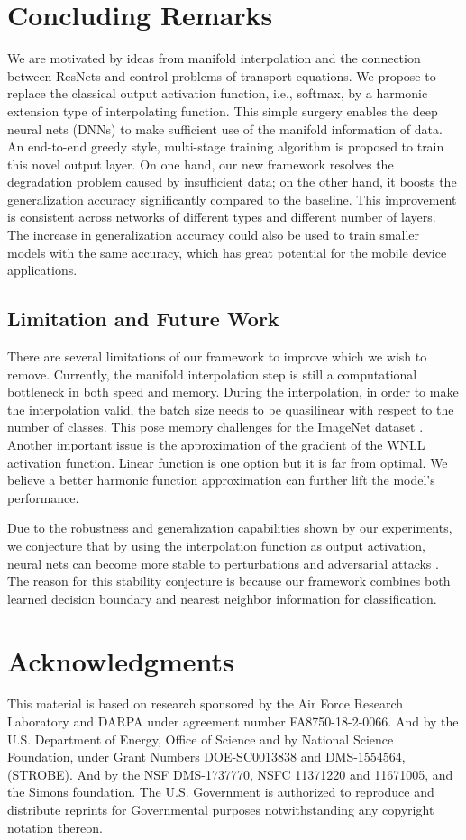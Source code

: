\documentclass{article}
\begin{document}
\section{Concluding Remarks}
We are motivated by ideas from manifold interpolation and the connection between ResNets and control problems of transport equations. We propose to replace the classical output activation function, i.e., softmax, by a harmonic extension type of interpolating function. This simple surgery enables the deep neural nets (DNNs) to make sufficient use of the manifold information of data. An end-to-end greedy style, multi-stage training algorithm is proposed to train this novel output layer. On one hand, our new framework resolves the degradation problem caused by insufficient data; on the other hand, it boosts the generalization accuracy significantly compared to the baseline. This improvement is consistent across networks of different types and different number of layers. The increase in generalization accuracy could also be used to train smaller models with the same accuracy, which has great potential for the mobile device applications.

\subsection{Limitation and Future Work}
There are several limitations of our framework to improve which we wish to remove. Currently, the manifold interpolation step is still a computational bottleneck in both speed and memory. During the interpolation, in order to make the interpolation valid, the batch size needs to be quasilinear with respect to the number of classes. This pose memory challenges for the ImageNet dataset \cite{imagenet_cvpr09}. Another important issue is the approximation of the gradient of the WNLL activation function. Linear function is one option but it is far from optimal. We believe a better harmonic function approximation can further lift the model's performance.

Due to the robustness and generalization capabilities shown by our experiments, we conjecture that by using the interpolation function as output activation, neural nets can become more stable to perturbations and adversarial attacks \cite{Papernot:2015}. The reason for this stability conjecture is because our framework combines both learned decision boundary and nearest neighbor information for classification. 

\clearpage
\section*{Acknowledgments}
This material is based on research sponsored by the Air Force Research Laboratory and DARPA under agreement number FA8750-18-2-0066. And by the U.S. Department of Energy,
Office of Science and by National Science Foundation, under Grant Numbers DOE-SC0013838
and DMS-1554564, (STROBE). And by the NSF DMS-1737770, NSFC 11371220 and 11671005, and the Simons foundation. The U.S. Government is authorized to reproduce and distribute reprints for Governmental purposes notwithstanding any copyright notation thereon.
\end{document}
